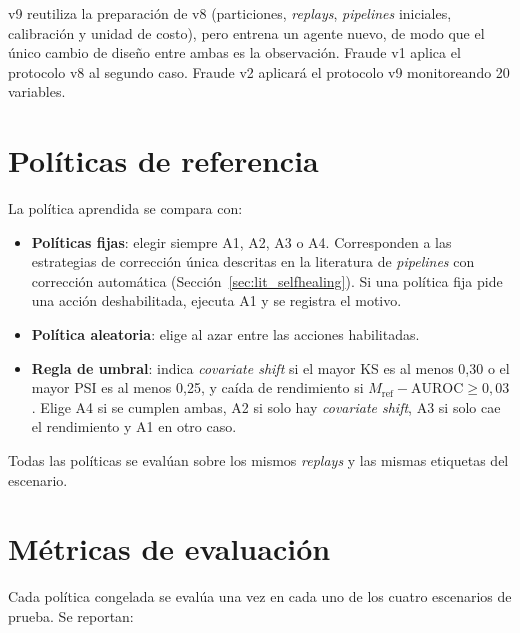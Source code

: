 v9 reutiliza la preparación de v8 (particiones, \textit{replays}, \textit{pipelines} iniciales,
calibración y unidad de costo), pero entrena un agente nuevo, de modo que el único cambio de
diseño entre ambas es la observación. Fraude v1 aplica el protocolo v8 al segundo caso. Fraude
v2 aplicará el protocolo v9 monitoreando 20 variables.

\section{Políticas de referencia}
\label{sec:met_referencias}

La política aprendida se compara con:

\begin{itemize}
    \item \textbf{Políticas fijas}: elegir siempre A1, A2, A3 o A4. Corresponden a las
    estrategias de corrección única descritas en la literatura de \textit{pipelines} con
    corrección automática (Sección~\ref{sec:lit_selfhealing}). Si una política fija pide una
    acción deshabilitada, ejecuta A1 y se registra el motivo.
    \item \textbf{Política aleatoria}: elige al azar entre las acciones habilitadas.
    \item \textbf{Regla de umbral}: indica \textit{covariate shift} si el mayor KS es al menos
    0,30 o el mayor PSI es al menos 0,25, y caída de rendimiento si $M_{\text{ref}} -
    \text{AUROC} \geq 0{,}03$. Elige A4 si se cumplen ambas, A2 si solo hay \textit{covariate
    shift}, A3 si solo cae el rendimiento y A1 en otro caso.
\end{itemize}

Todas las políticas se evalúan sobre los mismos \textit{replays} y las mismas etiquetas del
escenario.

\section{Métricas de evaluación}
\label{sec:met_metricas}

Cada política congelada se evalúa una vez en cada uno de los cuatro escenarios de prueba. Se
reportan:

